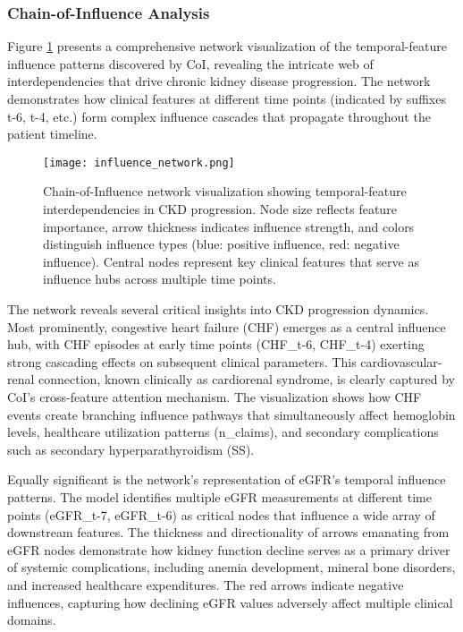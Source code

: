 \documentclass[letterpaper]{article}
\begin{document}
\begin{enumerate}
\subsubsection{Chain-of-Influence Analysis}

Figure \ref{fig:influence_network} presents a comprehensive network visualization of the temporal-feature influence patterns discovered by CoI, revealing the intricate web of interdependencies that drive chronic kidney disease progression. The network demonstrates how clinical features at different time points (indicated by suffixes t-6, t-4, etc.) form complex influence cascades that propagate throughout the patient timeline.

\begin{figure}[htbp]
\centering
\texttt{[image: influence\_network.png]}
\caption{Chain-of-Influence network visualization showing temporal-feature interdependencies in CKD progression. Node size reflects feature importance, arrow thickness indicates influence strength, and colors distinguish influence types (blue: positive influence, red: negative influence). Central nodes represent key clinical features that serve as influence hubs across multiple time points.}
\label{fig:influence_network}
\end{figure}

The network reveals several critical insights into CKD progression dynamics. Most prominently, congestive heart failure (CHF) emerges as a central influence hub, with CHF episodes at early time points (CHF\_t-6, CHF\_t-4) exerting strong cascading effects on subsequent clinical parameters. This cardiovascular-renal connection, known clinically as cardiorenal syndrome, is clearly captured by CoI's cross-feature attention mechanism. The visualization shows how CHF events create branching influence pathways that simultaneously affect hemoglobin levels, healthcare utilization patterns (n\_claims), and secondary complications such as secondary hyperparathyroidism (SS).

Equally significant is the network's representation of eGFR's temporal influence patterns. The model identifies multiple eGFR measurements at different time points (eGFR\_t-7, eGFR\_t-6) as critical nodes that influence a wide array of downstream features. The thickness and directionality of arrows emanating from eGFR nodes demonstrate how kidney function decline serves as a primary driver of systemic complications, including anemia development, mineral bone disorders, and increased healthcare expenditures. The red arrows indicate negative influences, capturing how declining eGFR values adversely affect multiple clinical domains.


\end{enumerate}
\end{document}
